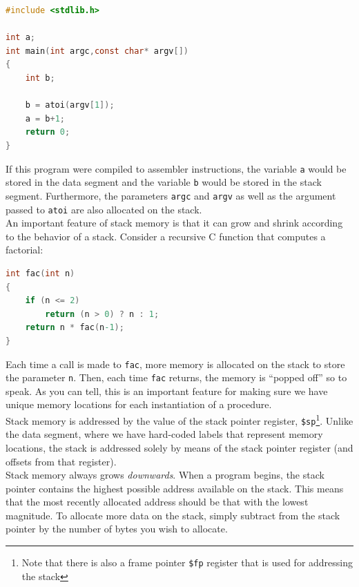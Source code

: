 \documentclass[12pt]{article}
\begin{document}
\begin{lstlisting}[language=C]
#include <stdlib.h>

int a;
int main(int argc,const char* argv[])
{
    int b;

    b = atoi(argv[1]);
    a = b+1;
    return 0;
}
\end{lstlisting}

If this program were compiled to assembler instructions, the variable \texttt{a}
     would be stored in the data segment and the variable \texttt{b} would be
     stored in the stack segment. Furthermore, the parameters \texttt{argc} and
     \texttt{argv} as well as the argument passed to \texttt{atoi} are also
     allocated on the stack.\\

An important feature of stack memory is that it can grow and shrink according to
     the behavior of a stack. Consider a recursive C function that computes a
     factorial:\\

\begin{lstlisting}[language=C]
int fac(int n)
{
    if (n <= 2)
        return (n > 0) ? n : 1;
    return n * fac(n-1);
}
\end{lstlisting}

Each time a call is made to \texttt{fac}, more memory is allocated on the stack
     to store the parameter \texttt{n}. Then, each time \texttt{fac} returns,
     the memory is ``popped off'' so to speak. As you can tell, this is an
     important feature for making sure we have unique memory locations for each
     instantiation of a procedure.\\

Stack memory is addressed by the value of the stack pointer register,
     \texttt{\$sp}\footnote{Note that there is also a frame pointer
     \texttt{\$fp} register that is used for addressing the stack}. Unlike the
     data segment, where we have hard-coded labels that represent memory
     locations, the stack is addressed solely by means of the stack pointer
     register (and offsets from that register).\\

Stack memory always grows \textit{downwards}. When a program begins, the stack
     pointer contains the highest possible address available on the stack. This
     means that the most recently allocated address should be that with the
     lowest magnitude. To allocate more data on the stack, simply subtract from
     the stack pointer by the number of bytes you wish to allocate.\\
\end{document}
